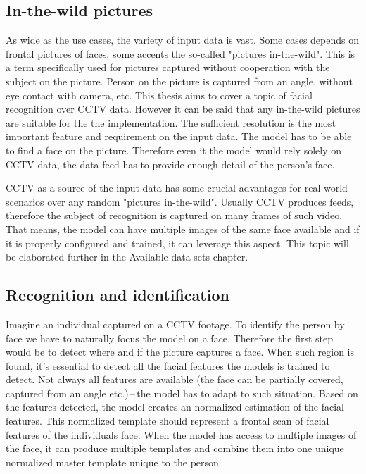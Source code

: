 \subsection{In-the-wild pictures}

As wide as the use cases, the variety of input data is vast. Some cases depends on frontal pictures of faces, some accents the so-called "pictures in-the-wild". This is a term specifically used for pictures captured without cooperation with the subject on the picture. Person on the picture is captured from an angle, without eye contact with camera, etc. This thesis aims to cover a topic of facial recognition over CCTV data. However it can be said that any in-the-wild pictures are suitable for the the implementation. The sufficient resolution is the most important feature and requirement on the input data. The model has to be able to find a face on the picture. Therefore even it the model would rely solely on CCTV data, the data feed has to provide enough detail of the person's face.


CCTV as a source of the input data has some crucial advantages for real world scenarios over any random "pictures in-the-wild". Usually CCTV produces feeds, therefore the subject of recognition is captured on many frames of such video. That means, the model can have multiple images of the same face available and if it is properly configured and trained, it can leverage this aspect. This topic will be elaborated further in the Available data sets chapter.

\subsection{Recognition and identification}

Imagine an individual captured on a CCTV footage. To identify the person by face we have to naturally focus the model on a face. Therefore the first step would be to detect where and if the picture captures a face. When such region is found, it's essential to detect all the facial features the models is trained to detect. Not always all features are available (the face can be partially covered, captured from an angle etc.)\,--\,the model has to adapt to such situation. Based on the features detected, the model creates an normalized estimation of the facial features. This normalized template should represent a frontal scan of facial features of the individuals face. When the model has access to multiple images of the face, it can produce multiple templates and combine them into one unique normalized master template unique to the person.


